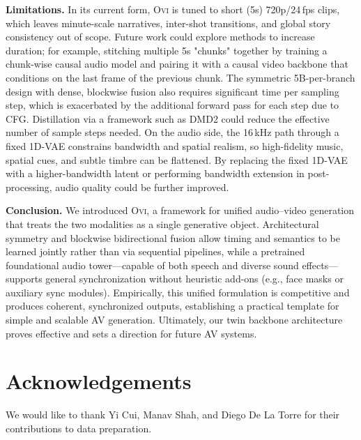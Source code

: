 \documentclass{article} %
\begin{document}
\textbf{Limitations. }
In its current form, \textsc{Ovi} is tuned to short (5s) 720p/24\,fps clips, which leaves minute-scale narratives, inter-shot transitions, and global story consistency out of scope. Future work could explore methods to increase duration; for example, stitching multiple 5s "chunks" together by training a chunk-wise causal audio model and pairing it with a causal video backbone that conditions on the last frame of the previous chunk. The symmetric 5B-per-branch design with dense, blockwise fusion also requires significant time per sampling step, which is exacerbated by the additional forward pass for each step due to CFG. Distillation via a framework such as DMD2 \citep{yin2024improved} could reduce the effective number of sample steps needed. On the audio side, the 16\,kHz path through a fixed 1D-VAE constrains bandwidth and spatial realism, so high-fidelity music, spatial cues, and subtle timbre can be flattened. By replacing the fixed 1D-VAE with a higher-bandwidth latent or performing bandwidth extension in post-processing, audio quality could be further improved. 

\textbf{Conclusion. }  
We introduced \textsc{Ovi}, a framework for unified audio–video generation that treats the two modalities as a single generative object. Architectural symmetry and blockwise bidirectional fusion allow timing and semantics to be learned jointly rather than via sequential pipelines, while a pretrained foundational audio tower—capable of both speech and diverse sound effects—supports general synchronization without heuristic add-ons (e.g., face masks or auxiliary sync modules). Empirically, this unified formulation is competitive and produces coherent, synchronized outputs, establishing a practical template for simple and scalable AV generation. Ultimately, our twin backbone architecture proves effective and sets a direction for future AV systems.

\section*{Acknowledgements}
We would like to thank Yi Cui, Manav Shah, and Diego De La Torre for their contributions to data preparation.


\newpage


\end{document}
